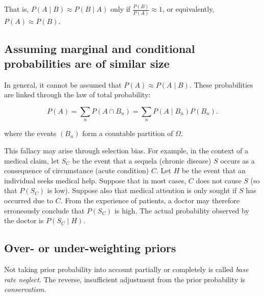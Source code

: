 That is, $P(A \mid B) \approx P(B \mid A)$ only if $\frac{P(B)}{P(A)} \approx 1$, or
equivalently, $P(A) \approx P(B)$.




\subsection{Assuming marginal and conditional probabilities are of similar size}
\label{sss:assu-2b77}




In general, it cannot be assumed that $P(A) \approx P(A \mid B)$. These probabilities are
linked through the law of total probability:



$$P(A) = \sum _n P(A \cap B _n) = \sum _n P(A\mid B _n)P(B _n).$$



where the events $(B _n)$ form a countable partition of $\Omega$.



This fallacy may arise through selection bias. For example, in the context of a medical
claim, let $S _{C}$ be the event that a sequela (chronic disease) $S$ occurs as a
consequence of circumstance (acute condition) $C$. Let $H$ be the event that an individual
seeks medical help. Suppose that in most cases, $C$ does not cause $S$ (so that $P(S
_{C})$ is low). Suppose also that medical attention is only sought if $S$ has occurred due
to $C$. From the experience of patients, a doctor may therefore erroneously conclude that
$P(S _{C})$ is high. The actual probability observed by the doctor is $P(S _{C} \mid H)$.




\subsection{Over- or under-weighting priors}
\label{sss:over-a200}




Not taking prior probability into account partially or completely is called \textit{base
rate neglect}. The reverse, insufficient adjustment from the prior probability is
\textit{conservatism}.




